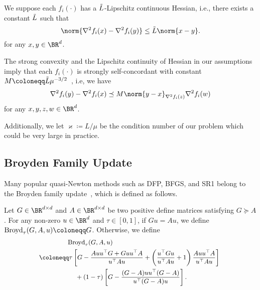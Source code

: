 \begin{assumption}\label{smooth_assumption}
    We suppose each $f_i(\cdot)$ has a $\Tilde{L}$-Lipschitz continuous Hessian, i.e., there exists a constant $\Tilde{L}$ such that 
    \begin{equation*}
        \norm{\nabla^2 f_i(x) - \nabla^2 f_i(y)} \leq \Tilde{L} \norm{x - y}.
    \end{equation*}
    for any $x, y \in \BR^d$.
\end{assumption}

The strong convexity and the Lipschitz continuity of Hessian in our assumptions imply that each $f_i(\cdot)$ is strongly self-concordant with constant $M \coloneqq\Tilde{L} \mu^{-3/2}$~\cite{rodomanov2021greedy}, i.e, we have
\begin{align*}
\nabla^2 f_i(y) - \nabla^2 f_i(x) \preceq M \norm{y - x}_{\nabla^2 f_i(z)} \nabla^2 f_i(w)    
\end{align*}
for any $x,y,z,w \in \BR^d$.

Additionally, we let $\varkappa\coloneqq L/\mu$ be the condition number of our problem which could be very large in practice.

\subsection{Broyden Family Update}

Many popular quasi-Newton methods such as DFP, BFGS, and SR1 belong to the Broyden family update~\cite[Section 6.3]{nocedal1999numerical}, which is defined as follows.

\begin{definition}
    Let $G\in\BR^{d \times d}$ and $A\in\BR^{d \times d}$ be two positive define matrices satisfying $G \succeq A$. For any non-zero $u \in \BR^d$ and $\tau\in[0,1]$, if $G u = A u$, we define 
    ${\rm Broyd}_{\tau}(G, A, u) \coloneqq G$. Otherwise, we define
    \begin{equation}
    \small
    \begin{split}
        \!& \!{\rm Broyd}_{\tau}(G, A, u) \\ 
        \!\!\coloneqq & \tau \left[ G - \frac{A u u^{\top}G + G u u^{\top} A}{u^{\top} A u} + \left( \frac{u^{\top} G u}{u^{\top} A u} + 1\right) \frac{A u u^{\top} A}{u^{\top} A u} \right] \\
        & \quad + (1 - \tau) \left[ G - \frac{(G - A) u u^{\top} (G - A)}{u^{\top} (G - A) u}\right].
    \end{split}
    \label{broyden_eq}
    \end{equation}
\end{definition}

